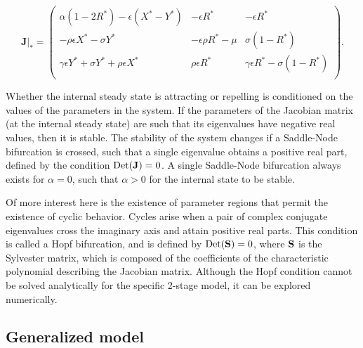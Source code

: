 \documentclass[11pt]{article}
\begin{document}
\begin{equation}
\mathbf{J}|_* = 
\left(
\begin{array}{ccc}
\alpha(1-2 R^*)-\epsilon (X^*-Y^*) & -\epsilon R^* & -\epsilon R^* \\
-\rho \epsilon X^*-\sigma Y^* & -\epsilon \rho R^*-\mu & \sigma(1-R^*) \\
\gamma \epsilon Y^*+\sigma Y^* +\rho \epsilon X^* & \rho \epsilon R^* & \gamma \epsilon R^* - \sigma(1-R^*) \\
\end{array}
\right).
\end{equation}

Whether the internal steady state is attracting or repelling is conditioned on the values of the parameters in the system.
If the parameters of the Jacobian matrix (at the internal steady state) are such that its eigenvalues have negative real values, then it is stable.
The stability of the system changes if a Saddle-Node bifurcation is crossed, such that a single eigenvalue obtains a positive real part, defined by the condition ${\rm Det}({\bf J})=0$.
A single Saddle-Node bifurcation always exists for $\alpha = 0$, such that $\alpha > 0$ for the internal state to be stable.

Of more interest here is the existence of parameter regions that permit the existence of cyclic behavior.
Cycles arise when a pair of complex conjugate eigenvalues cross the imaginary axis and attain positive real parts.
This condition is called a Hopf bifurcation, and is defined by ${\rm Det}({\bf S}) = 0$, where $\bf S$ is the Sylvester matrix, which is composed of the coefficients of the characteristic polynomial describing the Jacobian matrix.
Although the Hopf condition cannot be solved analytically for the specific 2-stage model, it can be explored numerically.

\subsection{Generalized model}
\end{document}
